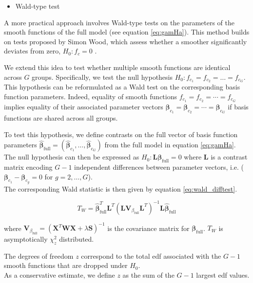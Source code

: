 \begin{itemize}
    \item Wald-type test
\end{itemize}

A more practical approach involves Wald-type tests on the parameters of the smooth functions of the full model (see equation \ref{eq:gamHa}). This method builds on tests proposed by Simon Wood, which assess whether a smoother significantly deviates from zero, $H_0 : f_c = 0$ \cite{Wald}.

We extend this idea to test whether multiple smooth functions are identical across $G$ groups. Specifically, we test the null hypothesis $H_0 : f_{c_1} = f_{c_2} = \dots = f_{c_G}$.
This hypothesis can be reformulated as a Wald test on the corresponding basis function parameters. Indeed, equality of smooth functions $f_{c_1} = f_{c_2} = \cdots = f_{c_G}$ implies equality of their associated parameter vectors $\boldsymbol{\beta}_{c_1} = \boldsymbol{\beta}_{c_2} = \cdots = \boldsymbol{\beta}_{c_G}$ if basis functions are shared across all groups.

To test this hypothesis, we define contrasts on the full vector of basis function parameters $\hat{\boldsymbol{\beta}}_{\text{full}} = (\hat{\boldsymbol{\beta}}_{c_1}, \dots, \hat{\boldsymbol{\beta}}_{c_G})$ from the full model in equation \ref{eq:gamHa}. The null hypothesis can then be expressed as $H_0: \boldsymbol{L}\boldsymbol{\beta}_{\text{full}} = 0$ where $\boldsymbol{L}$ is a contrast matrix encoding $G-1$ independent differences between parameter vectors, i.e. ($\boldsymbol{\beta}_{c_1} - \boldsymbol{\beta}_{c_g} = 0$ for $g = 2,\ldots,G$).\\
The corresponding Wald statistic is then given by equation \ref{eq:wald_difftest}.

\begin{equation}
    T_{W} = \hat{\boldsymbol{\beta}}_{\text{full}}^T\boldsymbol{L}^T(\boldsymbol{L}\boldsymbol{V}_{\beta_{\text{full}}} \boldsymbol{L}^T)^{-1} \boldsymbol{L}\hat{\boldsymbol{\beta}}_{\text{full}}
    \label{eq:wald_difftest}
\end{equation}

where $\boldsymbol{V}_{\beta_{\text{full}}} = (\boldsymbol{X}^T\boldsymbol{W}\boldsymbol{X} + \lambda \boldsymbol{S})^{-1}$ is the covariance matrix for $\boldsymbol{\beta}_{\text{full}}$. $T_W$ is asymptotically $\chi^2_z$ distributed.

The degrees of freedom $z$ correspond to the total edf associated with the $G-1$ smooth functions that are dropped under $H_0$.\\
As a conservative estimate, we define $z$ as the sum of the $G-1$ largest edf values.

